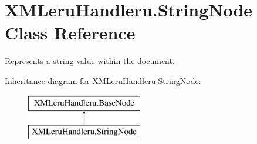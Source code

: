 \hypertarget{class_x_m_leru_handleru_1_1_string_node}{}\section{X\+M\+Leru\+Handleru.\+String\+Node Class Reference}
\label{class_x_m_leru_handleru_1_1_string_node}


Represents a string value within the document.  


Inheritance diagram for X\+M\+Leru\+Handleru.\+String\+Node\+:\begin{figure}[H]
\begin{center}
\leavevmode
\includegraphics[height=2.000000cm]{class_x_m_leru_handleru_1_1_string_node}
\end{center}
\end{figure}
